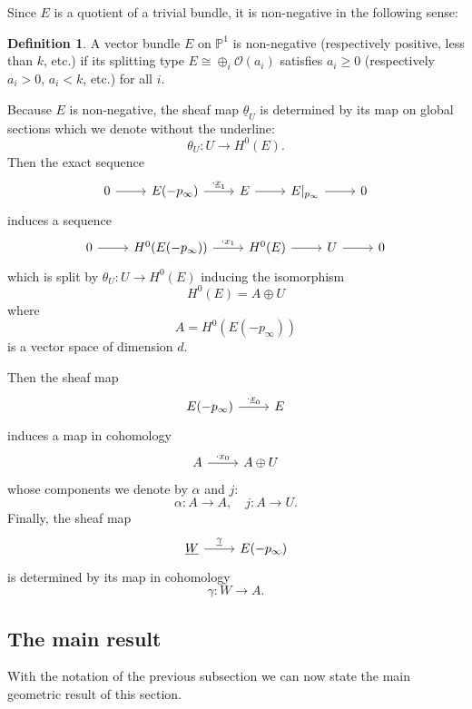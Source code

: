 \documentclass{amsart}
\theoremstyle{definition}
\newtheorem{definition}[theorem]{Definition}
\newcommand{\PP}{\mathbb{P}}
\newcommand{\OO}{\mathcal{O}}
\newcommand{\UL}[1]{\underline{#1}}
\begin{document}
Since $E$ is a quotient of a trivial bundle, it is non-negative in the
following sense:
\begin{definition}
A vector bundle $E$ on $\PP^{1}$ is non-negative (respectively
positive, less than $k$, etc.) if its splitting type $E\cong
\oplus_{i}\OO (a_{i})$ satisfies $a_{i} \geq 0$ (respectively
$a_{i}>0$, $a_{i}<k$, etc.) for all $i$. 
\end{definition}


Because $E$ is non-negative, the sheaf map $\UL{\theta}_{U}$ is
determined by its map on global sections which we denote without the
underline:
\[
\theta_{U}:U \longrightarrow H^{0}(E).
\]
Then the exact sequence
\[
\begin{tikzcd}
0\arrow[r]&E(-p_{\infty})\arrow{r}{\cdot \UL{x}_{1}}
&E\arrow[r]&E|_{p_{\infty}} \arrow[r] &0
\end{tikzcd}
\]
induces a sequence
\[
\begin{tikzcd}
0\arrow[r]&H^{0}(E(-p_{\infty}))\arrow{r}{\cdot {x}_{1}}
&H^{0}(E)\arrow[r]&U \arrow[r] &0
\end{tikzcd}
\]
which is split by $\theta_{U}:U\to H^{0}(E)$ inducing the isomorphism
\[
H^{0}(E) = A\oplus U
\]
where 
\[
A=H^{0}(E(-p_{\infty}))
\]
is a vector space of dimension $d$.

Then the sheaf map
\[
\begin{tikzcd}
 E(-p_{\infty})\arrow{r}{\cdot \UL{x}_{0}} &E
\end{tikzcd}
\]
induces a map in cohomology
\[
\begin{tikzcd}
A\arrow{r}{\cdot x_{0}} &A\oplus U
\end{tikzcd}
\]
whose components we denote by $\alpha$ and $j$:
\[
\alpha :A\to A, \quad j: A\to U.
\]
Finally, the sheaf map
\[
\begin{tikzcd}
\UL{W}\arrow{r}{\UL{\gamma}} & E(-p_{\infty})
\end{tikzcd}
\]
is determined by its map in cohomology
\[
\gamma :W\to A.
\]


\subsection{The main result}
With the notation of the previous subsection we can now state the main
geometric result of this section.
\end{document}

